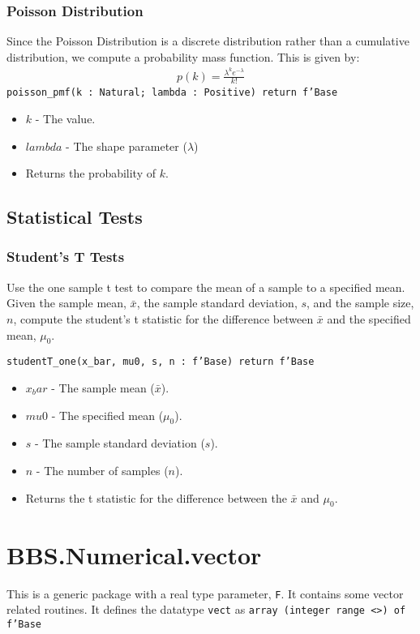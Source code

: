 \documentclass[10pt, openany]{book}
\newcommand{\function}[1]{\texttt{#1}}
\newcommand{\datatype}[1]{\texttt{#1}}
\begin{document}
\subsubsection{Poisson Distribution}
Since the Poisson Distribution is a discrete distribution rather than a cumulative distribution, we compute a probability mass function.  This is given by:
\begin{align*}
  p(k) = \frac{\lambda^k e^{-\lambda}}{k!}
\end{align*}
\function{poisson\_pmf(k : Natural; lambda : Positive) return f'Base}
\begin{itemize}
  \item $k$ - The value.
  \item $lambda$ - The shape parameter ($\lambda$)
  \item Returns the probability of $k$.
\end{itemize}


\subsection{Statistical Tests}

\subsubsection{Student's T Tests}
Use the one sample t test to compare the mean of a sample to a specified mean.  Given the sample mean, $\bar{x}$, the sample standard deviation, $s$, and the sample size, $n$, compute the student's t statistic for the difference between $\bar{x}$ and the specified mean, $\mu_0$.

\function{studentT\_one(x\_bar, mu0, s, n : f'Base) return f'Base}
\begin{itemize}
  \item $x_bar$ - The sample mean ($\bar{x}$).
  \item $mu0$ - The specified mean ($\mu_0$).
  \item $s$ - The sample standard deviation ($s$).
  \item $n$ - The number of samples ($n$).
  \item Returns the t statistic for the difference between the $\bar{x}$ and $\mu_0$.
\end{itemize}

\section{BBS.Numerical.vector}
This is a generic package with a real type parameter, \datatype{F}.  It contains some vector related routines.  It defines the datatype \datatype{vect} as \datatype{array (integer range <>) of f'Base}
\end{document}
